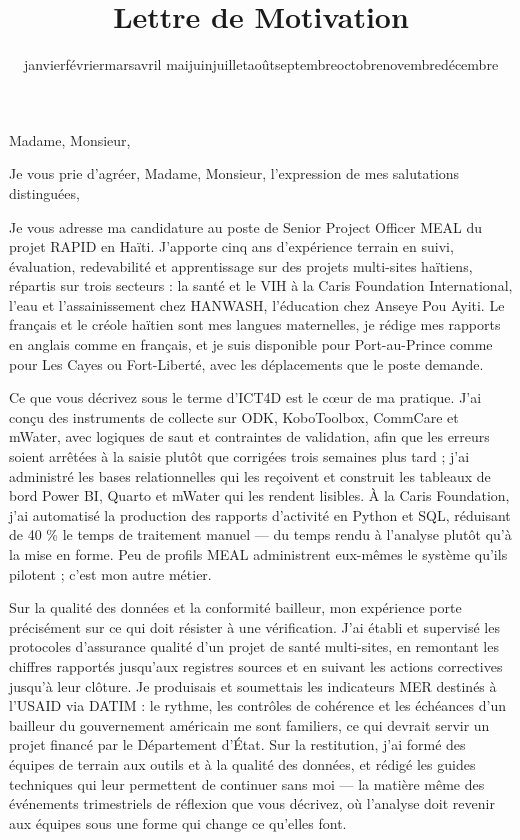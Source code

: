 \documentclass[10pt,a4paper,sans]{moderncv}
\title{Lettre de Motivation}
\renewcommand{\today}{\number\day\space\ifcase\month\or janvier\or février\or mars\or avril\or
mai\or juin\or juillet\or août\or septembre\or octobre\or novembre\or décembre\fi\space\number\year}
\begin{document}
\date{\today}
\opening{Madame, Monsieur,}
\closing{Je vous prie d'agréer, Madame, Monsieur, l'expression de mes salutations distinguées,}

\makelettertitle

Je vous adresse ma candidature au poste de Senior Project Officer MEAL du projet RAPID en Haïti. J'apporte cinq ans d'expérience terrain en suivi, évaluation, redevabilité et apprentissage sur des projets multi-sites haïtiens, répartis sur trois secteurs : la santé et le VIH à la Caris Foundation International, l'eau et l'assainissement chez HANWASH, l'éducation chez Anseye Pou Ayiti. Le français et le créole haïtien sont mes langues maternelles, je rédige mes rapports en anglais comme en français, et je suis disponible pour Port-au-Prince comme pour Les Cayes ou Fort-Liberté, avec les déplacements que le poste demande.

Ce que vous décrivez sous le terme d'ICT4D est le cœur de ma pratique. J'ai conçu des instruments de collecte sur ODK, KoboToolbox, CommCare et mWater, avec logiques de saut et contraintes de validation, afin que les erreurs soient arrêtées à la saisie plutôt que corrigées trois semaines plus tard ; j'ai administré les bases relationnelles qui les reçoivent et construit les tableaux de bord Power BI, Quarto et mWater qui les rendent lisibles. À la Caris Foundation, j'ai automatisé la production des rapports d'activité en Python et SQL, réduisant de 40 \% le temps de traitement manuel --- du temps rendu à l'analyse plutôt qu'à la mise en forme. Peu de profils MEAL administrent eux-mêmes le système qu'ils pilotent ; c'est mon autre métier.

Sur la qualité des données et la conformité bailleur, mon expérience porte précisément sur ce qui doit résister à une vérification. J'ai établi et supervisé les protocoles d'assurance qualité d'un projet de santé multi-sites, en remontant les chiffres rapportés jusqu'aux registres sources et en suivant les actions correctives jusqu'à leur clôture. Je produisais et soumettais les indicateurs MER destinés à l'USAID via DATIM : le rythme, les contrôles de cohérence et les échéances d'un bailleur du gouvernement américain me sont familiers, ce qui devrait servir un projet financé par le Département d'État. Sur la restitution, j'ai formé des équipes de terrain aux outils et à la qualité des données, et rédigé les guides techniques qui leur permettent de continuer sans moi --- la matière même des événements trimestriels de réflexion que vous décrivez, où l'analyse doit revenir aux équipes sous une forme qui change ce qu'elles font.
\end{document}
